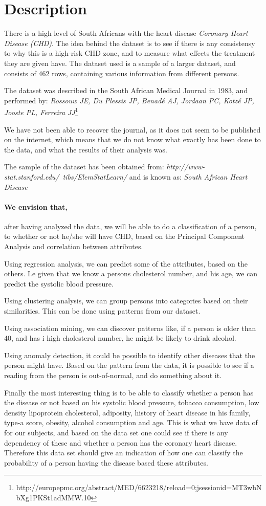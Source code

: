 \section{Description}
There is a high level of South Africans with the heart disease \textit{Coronary Heart Disease (CHD)}. The idea behind the dataset is to see if there is any consistensy to why this is a high-risk CHD zone, and to measure what effects the treatment they are given have. The dataset used is a sample of a larger dataset, and consists of 462 rows, containing various information from different persons.

The dataset was described in the South African Medical Journal in 1983, and performed by: \textit{Rossouw JE, Du Plessis JP, Benadé AJ, Jordaan PC, Kotzé JP, Jooste PL, Ferreira JJ}\footnote{http://europepmc.org/abstract/MED/6623218/reload=0;jsessionid=MT3wbNbXg1PKSt1adMMW.10}

We have not been able to recover the journal, as it does not seem to be published on the internet, which means that we do not know what exactly has been done to the data, and what the results of their analysis was.

The sample of the dataset has been obtained from: \textit{http://www-stat.stanford.edu/~tibs/ElemStatLearn/} and is known as: \textit{South African Heart Disease}

\paragraph{We envision that,} after having analyzed the data, we will be able to do a classification of a person, to whether or not he/she will have CHD, based on the Principal Component Analysis and correlation between attributes.

Using regression analysis, we can predict some of the attributes, based on the others. I.e given that we know a persons cholesterol number, and his age, we can predict the systolic blood pressure.

Using clustering analysis, we can group persons into categories based on their similarities. This can be done using patterns from our dataset.

Using association mining, we can discover patterns like, if a person is older than 40, and has i high cholesterol number, he might be likely to drink alcohol.

Using anomaly detection, it could be possible to identify other diseases that the person might have. Based on the pattern from the data, it is possible to see if a reading from the person is out-of-normal, and do something about it.

Finally the most interesting thing is to be able to classify whether a person has the disease or not based on his systolic blood pressure, tobacco consumption, low density lipoprotein cholesterol, adiposity, history of heart disease in his family, type-a score, obesity, alcohol consumption and age. This is what we have data of for our subjects, and based on the data set one could see if there is any dependency of these and whether a person has the coronary heart disease. Therefore this data set should give an indication of how one can classify the probability of a person having the disease based these attributes.